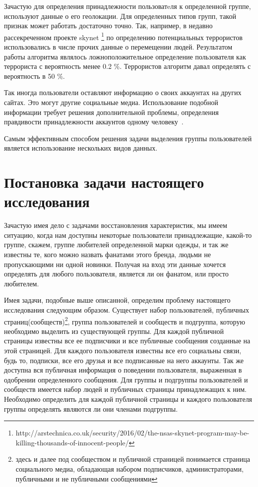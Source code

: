 \documentclass[annotation,times,page4]{itmo-student-thesis}
\begin{document}
Зачастую для определения принадлежности пользоватeля к определенной группе, используют данные о его геолокации. Для определенных типов групп, такой признак может работать достаточно точно. Так, например, в недавно рассекреченном проекте skynet \footnote{http://arstechnica.co.uk/security/2016/02/the-nsas-skynet-program-may-be-killing-thousands-of-innocent-people/} по определению потенциальных террористов использовались в числе прочих данные о перемещении людей. Результатом работы алгоритма являлось ложноположительное определение пользователя как террориста с вероятность менее 0.2 \%. Террористов алгоритм давал определять с вероятность в 50 \%.

Так иногда пользователи оставляют информацию о своих аккаунтах на других сайтах. Это могут другие социальные медиа. Использование подобной информации требует решения дополнительной проблемы, определения правдивости принадлежности аккаунтов одному человеку~\cite{peled2014matching}.  

Самым эффективным способом решения задачи выделения группы пользователей является использование нескольких видов данных. 

\section{Постановка задачи настоящего исследования}
Зачастую имея дело с задачами восстановления характеристик, мы имеем ситуацию, когда нам доступны некоторые пользователи принадлежащие, какой-то группе, скажем, группе любителей определенной марки одежды, и так же известны те, кого можно назвать фанатами этого бренда, людьми не пропускающими ни одной новинки. Получая на вход эти данные хочется определять для любого пользователя, является ли он фанатом, или просто любителем.

Имея задачи, подобные выше описанной, определим проблему настоящего исследования следующим образом. Существует набор пользователей, публичных страниц(сообществ)\footnote{здесь и далее под сообществом и публичной страницей понимается страница социального медиа, обладающая набором подписчиков, администраторами, публичными и не публичными сообщениями}, группа пользователей и сообществ и подгруппа, которую необходимо выделить из существующей группы. Для каждой публичной страницы известны все ее подписчики и все публичные сообщения созданные на этой страницей. Для каждого пользователя известны все его социальны связи, будь то, подписки, все его друзья и все подписанные на него аккаунты. Так же доступна вся публичная информация о поведении пользователя, выраженная в одобрении определенного сообщения. Для группы и подгруппы пользователей и сообществ имеется набор людей и публичных страницы принадлежащих к ним. Необходимо определить для каждой публичной страницы и каждого пользователя группы определять являются ли они членами подгруппы.
\end{document}
